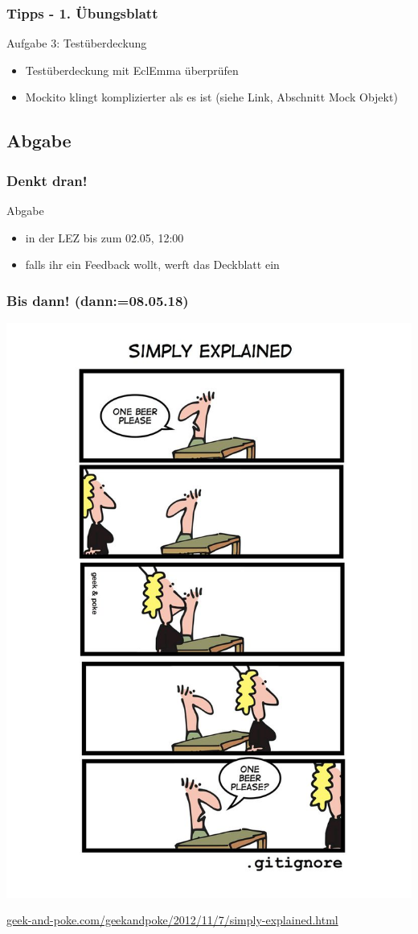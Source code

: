 \documentclass[18pt]{beamer}
\begin{document}
	\begin{frame}
		\frametitle{Tipps - 1. Übungsblatt}
		\begin{exampleblock}{Aufgabe 3: Testüberdeckung}
		\begin{itemize}
			\item Testüberdeckung mit EclEmma überprüfen
			\item Mockito klingt komplizierter als es ist (siehe Link, Abschnitt Mock Objekt)
		\end{itemize}
	\end{exampleblock}
\end{frame}
	
	\subsection{Abgabe}
	\begin{frame}
		\frametitle{Denkt dran!}
		\begin{alertblock}{Abgabe}
			\begin{itemize}
				\item in der LEZ bis zum 02.05, 12:00
				\item falls ihr ein Feedback wollt, werft das Deckblatt ein
			\end{itemize}
		\end{alertblock}
	\end{frame}
		
	\begin{frame}
		\frametitle{Bis dann! (dann:=08.05.18)}
		\centering
		\includegraphics[height=0.85\textheight]{./comics/geek_and_poke_gitignore.jpg}
		\begin{turn}{90}
			\tiny\url{geek-and-poke.com/geekandpoke/2012/11/7/simply-explained.html}
		\end{turn}
	\end{frame}
\end{document}

